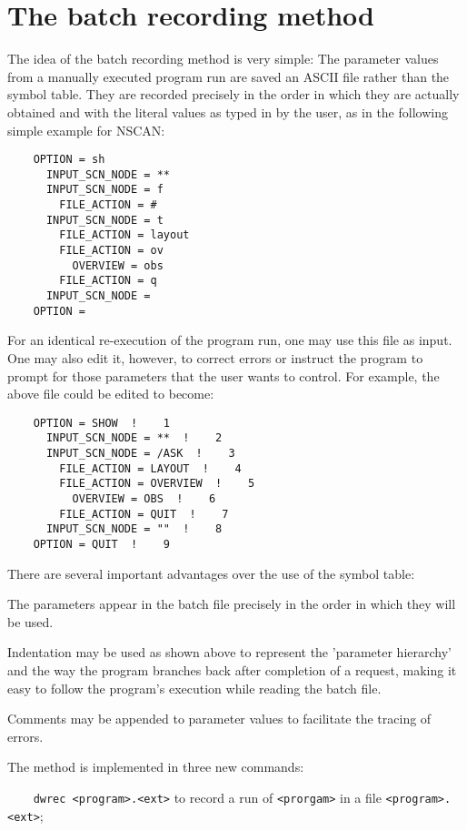 \section{ The batch recording method }
\label{.batch}

	The idea of the batch recording method is very simple: The parameter values from a manually executed program run are saved an ASCII file rather than the symbol table. They are recorded precisely in the order in which they are actually obtained and with the literal values as typed in by the user, as in the following simple example for NSCAN:

\spbegin \svbegin \begin{verbatim}
	OPTION = sh 
	  INPUT_SCN_NODE = ** 
	  INPUT_SCN_NODE = f 
	    FILE_ACTION = #  
	  INPUT_SCN_NODE = t 
	    FILE_ACTION = layout 
	    FILE_ACTION = ov 
	      OVERVIEW = obs 
	    FILE_ACTION = q 
	  INPUT_SCN_NODE =  
	OPTION =  
\end{verbatim} \svend \spend

	For an identical re-execution of the program run, one may use this file as input. One may also edit it, however, to correct errors or instruct the program to prompt for those parameters that the user wants to control. For example, the above file could be edited to become: 

\spbegin \svbegin \begin{verbatim}
	OPTION = SHOW  !    1  
	  INPUT_SCN_NODE = **  !    2 
	  INPUT_SCN_NODE = /ASK  !    3 
	    FILE_ACTION = LAYOUT  !    4 
	    FILE_ACTION = OVERVIEW  !    5 
	      OVERVIEW = OBS  !    6
	    FILE_ACTION = QUIT  !    7 
	  INPUT_SCN_NODE = ""  !    8 
	OPTION = QUIT  !    9
\end{verbatim} \svend \spend

	There are several important advantages over the use of the symbol table:
\bi
\item	The parameters appear in the batch file precisely in the order in which they will be used.

\item	Indentation may be used as shown above to represent the 'parameter hierarchy' and the way the program branches back after completion of a request, making it easy to follow the program's execution while reading the batch file.

\item	Comments may be appended to parameter values to facilitate the tracing of errors.
\ei

	The method is implemented in three new commands:
\bi
\item \verb/	dwrec <program>.<ext>/ to record a run of \verb/<prorgam>/ in a
 		file \verb/<program>.<ext>/;

